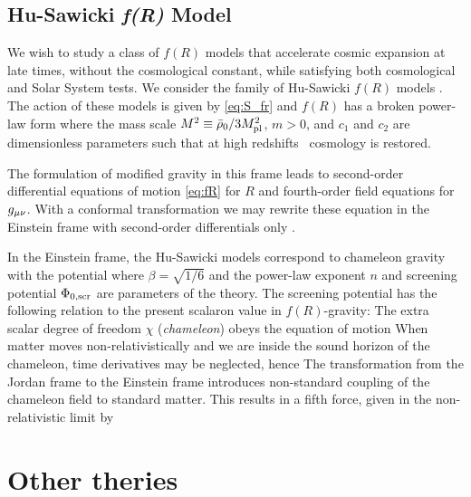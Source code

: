 \subsection{Hu-Sawicki \texorpdfstring{\textit{\lowercase{f}(R)}}{fR} Model}
We wish to study a class of $f(R)$ models that accelerate cosmic expansion at late times, without the cosmological constant, while satisfying both cosmological and Solar System tests. We consider the family of Hu-Sawicki $f(R)$ models \parencite{Hu-Saw}. The action of these models is given by \eqref{eq:S_fr} and $f(R)$ has a broken power-law form
where the mass scale $M^2\equiv\bar\rho_0/3M_{\text{\scriptsize pl}}^2$, $m>0$, and $c_1$ and $c_2$ are dimensionless parameters such that at high redshifts \LCDM\ cosmology is restored.

The formulation of modified gravity in this frame leads to second-order differential equations of motion \eqref{eq:fR} for $R$ and fourth-order field equations for $g_{\mu\nu}$. With a conformal transformation we may rewrite these equation in the Einstein frame with second-order differentials only \parencite[see, e.g.,][]{CHIBA20031}.

In the Einstein frame, the Hu-Sawicki models correspond to chameleon gravity with the potential
where $\beta=\sqrt{1/6}$ and the power-law exponent $n$ and screening potential $\Phi_{0,\text{\scriptsize scr}}$ are parameters of the theory. The screening potential has the following relation to the present scalaron value in $f(R)$-gravity:
The extra scalar degree of freedom $\chi$ (\textit{chameleon}) obeys the equation of motion
When matter moves non-relativistically and we are inside the sound horizon of the chameleon, time derivatives may be neglected, hence
The transformation from the Jordan frame to the Einstein frame introduces non-standard coupling of the chameleon field to standard matter. This results in a fifth force, given in the non-relativistic limit by

\section{Other theries}